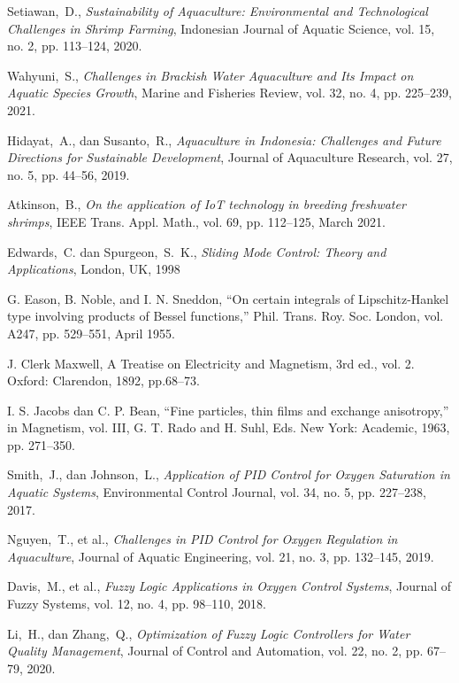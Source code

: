 Setiawan,~D., \emph{Sustainability of Aquaculture: Environmental and Technological Challenges in Shrimp Farming}, Indonesian Journal of Aquatic Science, vol. 15, no. 2, pp. 113–124, 2020.

Wahyuni,~S., \emph{Challenges in Brackish Water Aquaculture and Its Impact on Aquatic Species Growth}, Marine and Fisheries Review, vol. 32, no. 4, pp. 225–239, 2021.

Hidayat,~A., dan Susanto,~R., \emph{Aquaculture in Indonesia: Challenges and Future Directions for Sustainable Development}, Journal of Aquaculture Research, vol. 27, no. 5, pp. 44–56, 2019.

Atkinson,~B., \emph{On the application of IoT technology in breeding freshwater shrimps}, IEEE Trans. Appl. Math., vol. 69, pp. 112–125, March 2021.

Edwards,~C. dan Spurgeon,~S.~K., \emph{Sliding Mode Control: Theory and Applications}, London, UK, 1998

G. Eason, B. Noble, and I. N. Sneddon, ``On certain integrals of Lipschitz-Hankel type involving products of Bessel functions,'' Phil. Trans. Roy. Soc. London, vol. A247, pp. 529--551, April 1955.

J. Clerk Maxwell, A Treatise on Electricity and Magnetism, 3rd ed., vol. 2. Oxford: Clarendon, 1892, pp.68--73.

I. S. Jacobs dan C. P. Bean, ``Fine particles, thin films and exchange anisotropy,'' in Magnetism, vol. III, G. T. Rado and H. Suhl, Eds. New York: Academic, 1963, pp. 271--350.

Smith,~J., dan Johnson,~L., \emph{Application of PID Control for Oxygen Saturation in Aquatic Systems}, Environmental Control Journal, vol. 34, no. 5, pp. 227–238, 2017.

Nguyen,~T., et al., \emph{Challenges in PID Control for Oxygen Regulation in Aquaculture}, Journal of Aquatic Engineering, vol. 21, no. 3, pp. 132–145, 2019.

Davis,~M., et al., \emph{Fuzzy Logic Applications in Oxygen Control Systems}, Journal of Fuzzy Systems, vol. 12, no. 4, pp. 98–110, 2018.

Li,~H., dan Zhang,~Q., \emph{Optimization of Fuzzy Logic Controllers for Water Quality Management}, Journal of Control and Automation, vol. 22, no. 2, pp. 67–79, 2020.

